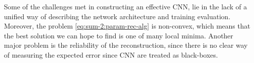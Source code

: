 Some of the challenges met in constructing an effective CNN, lie in the lack of
a unified way of describing the network architecture and training evaluation.
Moreover, the problem \eqref{eq:sum-2:param-rec-alg} is non-convex, which means
that the best solution we can hope to find is one of many local minima. Another
major problem is the reliability of the reconstruction, since there is no clear
way of measuring the expected error since CNN are treated as black-boxes.




